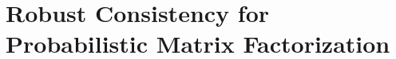 \section{Robust Consistency for Probabilistic Matrix Factorization} \label{sec:PMF-consistency-proof}






